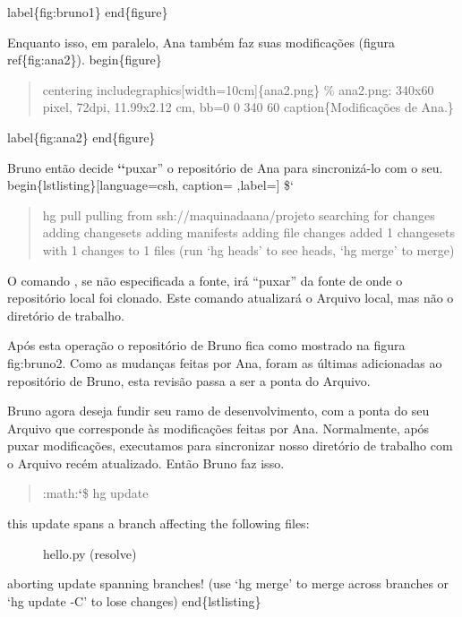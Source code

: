 \documentclass[a4paper,10pt,brazil]{sphinxmanual}
\begin{document}
label\{fig:bruno1\}
end\{figure\}

Enquanto isso, em paralelo, Ana também faz suas modificações (figura ref\{fig:ana2\}).
begin\{figure\}
\begin{quote}

centering
includegraphics{[}width=10cm{]}\{ana2.png\}
\% ana2.png: 340x60 pixel, 72dpi, 11.99x2.12 cm, bb=0 0 340 60
caption\{Modificações de Ana.\}
\end{quote}

label\{fig:ana2\}
end\{figure\}

Bruno então decide {\color{red}\bfseries{}{}`{}`}puxar'' o repositório de Ana para sincronizá-lo com o seu.
begin\{lstlisting\}{[}language=csh, caption= ,label={]}
\${}`
\begin{quote}

hg pull pulling from ssh://maquinadaana/projeto searching for
changes adding changesets adding manifests adding file changes
added 1 changesets with 1 changes to 1 files (run `hg heads' to see
heads, `hg merge' to merge)
\end{quote}

O comando , se não especificada a fonte, irá ``puxar'' da
fonte de onde o repositório local foi clonado. Este comando
atualizará o Arquivo local, mas não o diretório de trabalho.

Após esta operação o repositório de Bruno fica como mostrado na
figura fig:bruno2. Como as mudanças feitas por Ana, foram as
últimas adicionadas ao repositório de Bruno, esta revisão passa a
ser a ponta do Arquivo.

Bruno agora deseja fundir seu ramo de desenvolvimento, com a ponta
do seu Arquivo que corresponde às modificações feitas por Ana.
Normalmente, após puxar modificações, executamos  para
sincronizar nosso diretório de trabalho com o Arquivo recém
atualizado. Então Bruno faz isso.
\begin{quote}

:math:{\color{red}\bfseries{}{}`}\$ hg update
\end{quote}
\begin{description}
\item[{this update spans a branch affecting the following files:}] \leavevmode
hello.py (resolve)

\end{description}

aborting update spanning branches!
(use `hg merge' to merge across branches or `hg update -C' to lose changes)
end\{lstlisting\}
\end{document}
